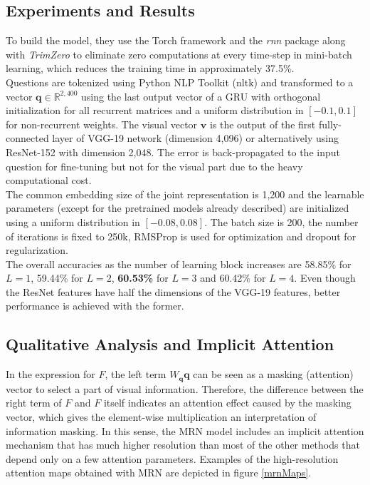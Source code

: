 \documentclass{article}
\begin{document}
\subsection{Experiments and Results}
To build the model, they use the Torch framework and the \emph{rnn} package along with \emph{TrimZero} to eliminate zero computations at every time-step in mini-batch learning, which reduces the training time in approximately 37.5\%.\\
Questions are tokenized using Python NLP Toolkit (nltk) and transformed to a vector $\bm{q} \in \mathbb{R}^{2,400}$ using the last output vector of a GRU with orthogonal initialization for all recurrent matrices and a uniform distribution in $[-0.1,0.1]$ for non-recurrent weights. The visual vector $\bm{v}$ is the output of the first fully-connected layer of VGG-19 network (dimension 4,096) or alternatively using ResNet-152 with dimension 2,048. The error is back-propagated to the input question for fine-tuning but not for the visual part due to the heavy computational cost.\\
The common embedding size of the joint representation is 1,200 and the learnable parameters (except for the pretrained models already described) are initialized using a uniform distribution in $[-0.08,0.08]$. The batch size is 200, the number of iterations is fixed to 250k, RMSProp is used for optimization and dropout for regularization.\\
The overall accuracies as the number of learning block increases are 58.85\% for $L=1$, 59.44\% for $L=2$, \textbf{60.53\%} for $L=3$ and 60.42\% for $L=4$. Even though the ResNet features have half the dimensions of the VGG-19 features, better performance is achieved with the former. 
\subsection{Qualitative Analysis and Implicit Attention}
In the expression for $F$, the left term $W_{\bm{q}}\bm{q}$ can be seen as a masking (attention) vector to select a part of visual information. Therefore, the difference between the right term of $F$ and $F$ itself indicates an attention effect caused by the masking vector, which gives the element-wise multiplication an interpretation of information masking. In this sense, the MRN model includes an implicit attention mechanism that has much higher resolution than most of the other methods that depend only on a few attention parameters. Examples of the high-resolution attention maps obtained with MRN are depicted in figure \ref{mrnMaps}.
\end{document}
